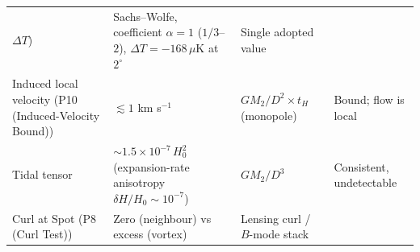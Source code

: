\documentclass[
  11pt,
]{article}
\begin{document}
\begin{longtable}[]{@{}llll@{}}
\begin{minipage}[t]{0.22\columnwidth}
\(\Delta T\))\strut
\end{minipage} & \begin{minipage}[t]{0.22\columnwidth}\raggedright
Sachs--Wolfe, coefficient \(\alpha = 1\) (\(1/3\)--\(2\)),
\(\Delta T = -168\,\mu\)K at \(2^\circ\)\strut
\end{minipage} & \begin{minipage}[t]{0.22\columnwidth}\raggedright
Single adopted value\strut
\end{minipage}\tabularnewline
\begin{minipage}[t]{0.22\columnwidth}\raggedright
Induced local velocity (P10 (Induced-Velocity Bound))\strut
\end{minipage} & \begin{minipage}[t]{0.22\columnwidth}\raggedright
\(\lesssim 1\) km s\(^{-1}\)\strut
\end{minipage} & \begin{minipage}[t]{0.22\columnwidth}\raggedright
\(GM_2/D^2 \times t_H\) (monopole)\strut
\end{minipage} & \begin{minipage}[t]{0.22\columnwidth}\raggedright
Bound; flow is local\strut
\end{minipage}\tabularnewline
\begin{minipage}[t]{0.22\columnwidth}\raggedright
Tidal tensor\strut
\end{minipage} & \begin{minipage}[t]{0.22\columnwidth}\raggedright
\(\sim\!1.5\times10^{-7}\,H_0^2\) (expansion-rate anisotropy
\(\delta H/H_0 \sim 10^{-7}\))\strut
\end{minipage} & \begin{minipage}[t]{0.22\columnwidth}\raggedright
\(GM_2/D^3\)\strut
\end{minipage} & \begin{minipage}[t]{0.22\columnwidth}\raggedright
Consistent, undetectable\strut
\end{minipage}\tabularnewline
\begin{minipage}[t]{0.22\columnwidth}\raggedright
Curl at Spot (P8 (Curl Test))\strut
\end{minipage} & \begin{minipage}[t]{0.22\columnwidth}\raggedright
Zero (neighbour) vs excess (vortex)\strut
\end{minipage} & \begin{minipage}[t]{0.22\columnwidth}\raggedright
Lensing curl / \(B\)-mode stack\strut
\end{minipage} & \begin{minipage}[t]{0.22\columnwidth}\raggedright

\end{minipage}
\end{longtable}
\end{document}
